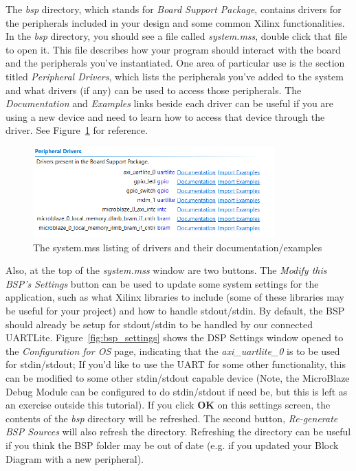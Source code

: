 \documentclass[11pt]{article}
\begin{document}
The \textit{bsp} directory, which stands for \textit{Board Support Package}, contains drivers for the peripherals included in your design and some common Xilinx functionalities. In the \textit{bsp} directory, you should see a file called \textit{system.mss}, double click that file to open it. This file describes how your program should interact with the board and the peripherals you've instantiated. One area of particular use is the section titled \textit{Peripheral Drivers}, which lists the peripherals you've added to the system and what drivers (if any) can be used to access those peripherals. The \textit{Documentation} and \textit{Examples} links beside each driver can be useful if you are using a new device and need to learn how to access that device through the driver. See Figure~\ref{fig:driver_list} for reference.

\begin{figure}[!h]
    \centering
    \includegraphics[width=0.83\textwidth]{images/driver_list.png}
    \caption{The system.mss listing of drivers and their documentation/examples}
    \label{fig:driver_list}
\end{figure}

Also, at the top of the \textit{system.mss} window are two buttons. The \textit{Modify this BSP's Settings} button can be used to update some system settings for the application, such as what Xilinx libraries to include (some of these libraries may be useful for your project) and how to handle stdout/stdin. By default, the BSP should already be setup for stdout/stdin to be handled by our connected UARTLite. Figure~\ref{fig:bsp_settings} shows the DSP Settings window opened to the \textit{Configuration for OS} page, indicating that the \textit{axi\_uartlite\_0} is to be used for stdin/stdout; If you'd like to use the UART for some other functionality, this can be modified to some other stdin/stdout capable device (Note, the MicroBlaze Debug Module can be configured to do stdin/stdout if need be, but this is left as an exercise outside this tutorial). If you click \textbf{OK} on this settings screen, the contents of the \textit{bsp} directory will be refreshed. The second button, \textit{Re-generate BSP Sources} will also refresh the directory. Refreshing the directory can be useful if you think the BSP folder may be out of date (e.g. if you updated your Block Diagram with a new peripheral).
\end{document}
